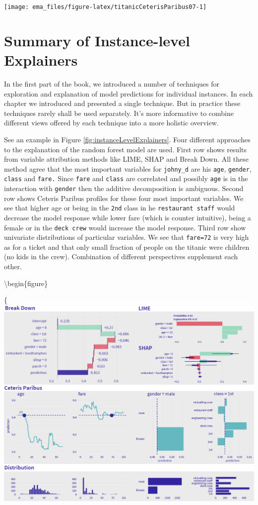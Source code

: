 \documentclass[12pt,]{krantz}
\begin{document}
\begin{center}\texttt{[image: ema\_files/figure-latex/titanicCeterisParibus07-1]} \end{center}

\hypertarget{summaryInstanceLevel}{%
\section{Summary of Instance-level Explainers}\label{summaryInstanceLevel}}

In the first part of the book, we introduced a number of techniques for exploration and explanation of model predictions for individual instances.
In each chapter we introduced and presented a single technique.
But in practice these techniques rarely shall be used separately. It's more informative to combine different views offered by each technique into a more holistic overview.

See an example in Figure \ref{fig:instanceLevelExplainers}. Four different approaches to the explanation of the random forest model are used.
First row shows results from variable attribution methods like LIME, SHAP and Break Down. All these method agree that the most important variables for \texttt{johny\_d} are his \texttt{age}, \texttt{gender}, \texttt{class} and \texttt{fare.} Since \texttt{fare} and \texttt{class} are correlated and possibly \texttt{age} is in the interaction with \texttt{gender} then the additive decomposition is ambiguous.
Second row shows Ceteris Paribus profiles for these four most important variables. We see that higher age or being in the \texttt{2nd} class in he \texttt{restaurant\ staff} would decrease the model response while lower fare (which is counter intuitive), being a female or in the \texttt{deck\ crew} would increase the model response.
Third row show univariate distributions of particular variables. We see that \texttt{fare=72} is very high as for a ticket and that only small fraction of people on the titanic were children (no kids in the crew). Combination of different perspectives supplement each other.

\textbackslash{}begin\{figure\}

\{\centering \includegraphics[width=1\linewidth]{figure/instance_level}
\end{document}
